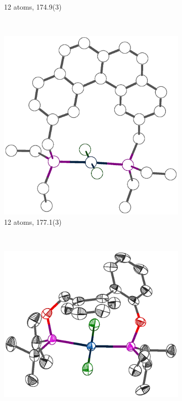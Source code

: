 \begin{figure}[htbp]
\begin{subfigure}[b]{0.4\textwidth}
                \caption{12 atoms, 174.9(3)\degrees}
                \label{CAZXIM}
        \end{subfigure}
        \\
        \begin{subfigure}[b]{0.32\textwidth}
                \includegraphics[width=\textwidth]{../Othercrystals/PtCl2/Trans/KOWHIN.eps}
                \caption{12 atoms, 177.1(3)\degrees}
                \label{KOWHIN}
        \end{subfigure}
        ~
        \begin{subfigure}[b]{0.32\textwidth}
                \includegraphics[width=\textwidth]{../Othercrystals/PtCl2//Trans/613904.eps}

\end{subfigure}
\end{figure}

